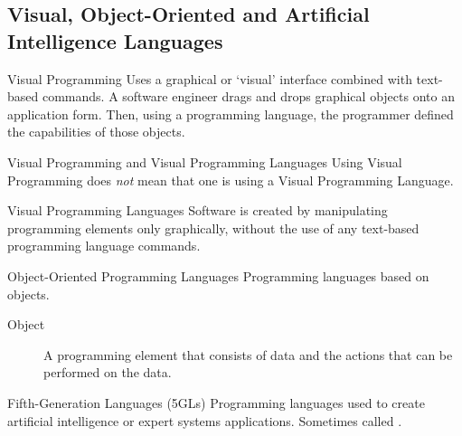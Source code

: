 \documentclass[\main/notes.tex]{subfiles}
\begin{document}
			\subsection{Visual, Object-Oriented and Artificial Intelligence Languages}
					\begin{definition}{Visual Programming}
						Uses a graphical or `visual' interface combined with text-based commands. A software engineer drags and drops graphical objects onto an application form. Then, using a programming language, the programmer defined the capabilities of those objects.
					\end{definition}
					\begin{sidenote}{Visual Programming and Visual Programming Languages}
						Using Visual Programming does \emph{not} mean that one is using a Visual Programming Language.
					\end{sidenote}
					\begin{definition}{Visual Programming Languages}
						Software is created by manipulating programming elements only graphically, without the use of any text-based programming language commands.
					\end{definition}
					\begin{definition}{Object-Oriented Programming Languages}
						Programming languages based on objects.
						\begin{description}
							\item[Object] A programming element that consists of data and the actions that can be performed on the data.
						\end{description}
					\end{definition}
					\begin{definition}{Fifth-Generation Languages (5GLs)}
						Programming languages used to create artificial intelligence or expert systems applications. Sometimes called .
					\end{definition}
\end{document}
